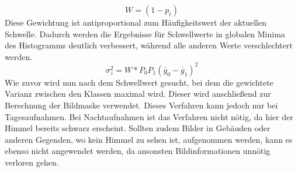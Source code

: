 \documentclass[12pt,a4paper,titlepage]{scrartcl}
\begin{document}
\begin{equation}
W=(1-p_t)
\end{equation}
Diese Gewichtung ist antiproportional zum Häufigkeitswert der aktuellen Schwelle. Dadurch werden die Ergebnisse für Schwellwerte in globalen Minima des Histogramms deutlich verbessert, während alle anderen Werte verschlechtert werden.
\begin{equation}
\sigma_z^2=W*P_0P_1(\overline{g}_0-\overline{g}_1)^2
\end{equation}
Wie zuvor wird nun nach dem Schwellwert gesucht, bei dem die gewichtete Varianz zwischen den Klassen maximal wird. Dieser wird anschließend zur Berechnung der Bildmaske verwendet. Dieses Verfahren kann jedoch nur bei Tagesaufnahmen. Bei Nachtaufnahmen ist das Verfahren nicht nötig, da hier der Himmel bereits schwarz erscheint. Sollten zudem Bilder in Gebäuden oder anderen Gegenden, wo kein Himmel zu sehen ist, aufgenommen werden, kann es ebenso nicht angewendet werden, da ansonsten Bildinformationen unnötig verloren gehen. 
\end{document}
